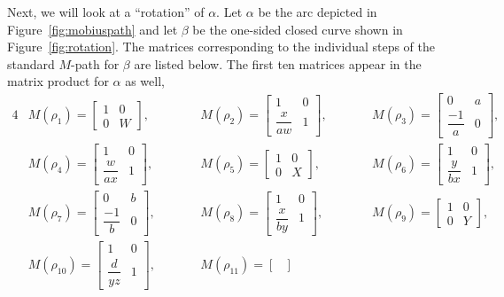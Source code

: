\documentclass[10pt,a4paper]{amsart}
\numberwithin{equation}{section}
\theoremstyle{definition}
\begin{document}
Next, we will look at a ``rotation'' of $\alpha$. Let $\alpha$ be the arc depicted in Figure~\ref{fig:mobiuspath} and let $\beta$ be the one-sided closed curve shown in Figure~\ref{fig:rotation}. The matrices corresponding to the individual steps of the standard $M$-path for $\beta$ are listed below. The first ten matrices appear in the matrix product for $\alpha$ as well,
\begin{alignat*}{4}
&M( \rho_{1}) = \begin{bmatrix}
1 & 0\\
0 & W
\end{bmatrix} ,\qquad&&
 M( \rho _{2}) = \begin{bmatrix}
1 & 0\\
\dfrac{x}{aw} & 1
\end{bmatrix} ,\qquad&& M( \rho _{3}) = \begin{bmatrix}
0 & a\\
\dfrac{-1}{a} & 0
\end{bmatrix} ,&\\ &M( \rho _{4}) = \begin{bmatrix}
1 & 0\\
\dfrac{w}{ax} & 1
\end{bmatrix} ,\qquad&&
M( \rho _{5}) = \begin{bmatrix}
1 & 0\\
0 & X
\end{bmatrix} ,\qquad&& M( \rho _{6}) = \begin{bmatrix}
1 & 0\\
\dfrac{y}{bx} & 1
\end{bmatrix} ,&\\ &M( \rho _{7}) = \begin{bmatrix}
0 & b\\
\dfrac{-1}{b} & 0
\end{bmatrix} ,\qquad&& M( \rho _{8}) = \begin{bmatrix}
1 & 0\\
\dfrac{x}{by} & 1
\end{bmatrix} ,
\qquad&&
M( \rho _{9}) = \begin{bmatrix}
1 & 0\\
0 & Y
\end{bmatrix} ,&\\ &M( \rho _{10}) = \begin{bmatrix}
1 & 0\\
\dfrac{d}{yz} & 1
\end{bmatrix} ,\qquad&& M( \rho _{11}) = \begin{bmatrix}

\end{bmatrix}
\end{alignat*}
\end{document}
